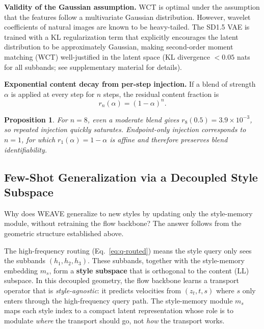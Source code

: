 \documentclass[letterpaper]{article}
\newtheorem{proposition}{Proposition}
\begin{document}
\textbf{Validity of the Gaussian assumption.}
WCT is optimal under the assumption that the features follow a multivariate Gaussian distribution.
However, wavelet coefficients of natural images are known to be heavy-tailed.
The SD1.5 VAE is trained with a KL regularization term that explicitly encourages the latent distribution to be approximately Gaussian, making second-order moment matching (WCT) well-justified in the latent space (KL divergence $<0.05$ nats for all subbands; see supplementary material for details).

\textbf{Exponential content decay from per-step injection.}
If a blend of strength $\alpha$ is applied at every step for $n$ steps, the residual content fraction is
\begin{equation}
r_n(\alpha) = (1-\alpha)^n.
\end{equation}

\begin{proposition}
\label{prop:eota}
For $n=8$, even a moderate blend gives $r_8(0.5)=3.9\times10^{-3}$, so repeated injection quickly saturates.
Endpoint-only injection corresponds to $n=1$, for which $r_1(\alpha)=1-\alpha$ is affine and therefore preserves blend identifiability.
\end{proposition}

\subsection{Few-Shot Generalization via a Decoupled Style Subspace}
\label{sec:fewshot}

Why does WEAVE generalize to new styles by updating only the style-memory module, without retraining the flow backbone?
The answer follows from the geometric structure established above.

The high-frequency routing (Eq.~\ref{eq:q-routed}) means the style query only sees the subbands $(h_1,h_2,h_3)$.
These subbands, together with the style-memory embedding $m_s$, form a \textbf{style subspace} that is orthogonal to the content (LL) subspace.
In this decoupled geometry, the flow backbone learns a transport operator that is \emph{style-agnostic}: it predicts velocities from $(z_t, t, s)$ where $s$ only enters through the high-frequency query path.
The style-memory module $m_s$ maps each style index to a compact latent representation whose role is to modulate \emph{where} the transport should go, not \emph{how} the transport works.
\end{document}
